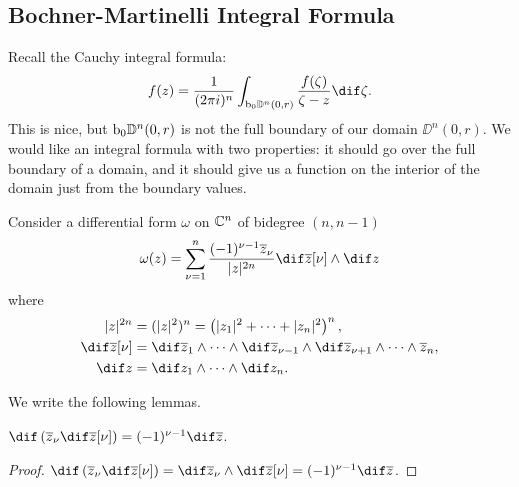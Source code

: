 \subsection{Bochner-Martinelli Integral Formula}

Recall the Cauchy integral formula:
\begin{align*}
    f(z) = \frac{1}{(2 \pi i)^n} \int_{\bdy_0 \DD^n(0,r) } \frac{f(\zeta)}{\zeta - z} \dif \zeta.
\end{align*}
This is nice, but $\operatorname{b}\!_0 \mathbb{D}^n(0,r)$ is not the full boundary of our domain $\DD^n(0,r)$. We would like an integral formula with two properties: it should go over the full boundary of a domain, and it should give us a function on the interior of the domain just from the boundary values.

Consider a differential form $\omega$ on $\mathbb{C}^n$ of bidegree $(n,n-1)$
\begin{align*}
    \omega(z) = \sum_{\nu = 1}^n \frac{(-1)^{\nu-1} \zz_\nu}{|z|^{2n}} \dif \zz[\nu] \wedge \dif z
\end{align*}
where
\begin{align*}
    |z|^{2n} &= (|z|^2)^n = \br{|z_1|^2 + \cdots + |z_n|^2}^n,\\
    \dif \zz[\nu] &= \dif \zz_1 \wedge \cdots \wedge \dif \zz_{\nu-1} \wedge \dif \zz_{\nu+1} \wedge \cdots \wedge \zz_{n},\\
    \dif z &= \dif z_1 \wedge \cdots \wedge \dif z_n.
\end{align*}

We write the following lemmas.

\begin{lemma}\label{lem:BMcalc1}
    $\dif \br{ \zz_\nu \dif \zz[\nu]} = (-1)^{\nu-1} \dif \zz$.
\end{lemma}
\begin{proof}
    $\dif \br{ \zz_\nu \dif \zz[\nu]} = \dif \zz_\nu \wedge \dif \zz [\nu] = (-1)^{\nu-1} \dif \zz$.
\end{proof}

